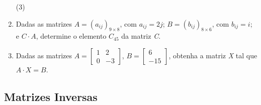 \begin{enumerate}[label*=\protect\fbox{\arabic{enumi}}]
{      \begin{tasks}(3)
      \end{tasks}
    }

  \item {
      Dadas as matrizes $A = (a_{ij})_{9 \times 8}$, com $a_{ij} = 2j$; $B = (b_{ij})_{8 \times 6}$, com $b_{ij} = i$; e $C \cdot A$,
      determine o elemento $C_{45}$ da matriz \textit{C}.
    }

  \item {
      Dadas as matrizes $A = \begin{bmatrix}
        1 & 2\\
        0 & -3
      \end{bmatrix}$, $B = \begin{bmatrix}
        6 \\
        -15
      \end{bmatrix}$, obtenha a matriz \textit{X} tal que $A \cdot X = B$.
    }
\end{enumerate}

\subsection{Matrizes Inversas}


